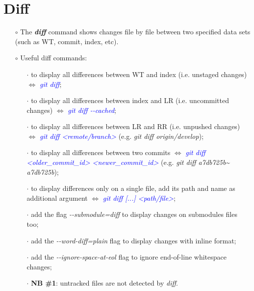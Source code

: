 \documentclass[a4paper,portrait,10pt]{article}   %
\newcommand{\mybulletlvA}{$\circ$}   %
\newcommand{\mybulletlvB}{$\cdot$}   %
\newcommand{\mydiv}{$\Leftrightarrow$ }   %
\newcommand{\mycmd}[1]{\textcolor{blue}{\textit{#1}}}   %
\newcommand{\myvspace}{\vspace{4mm}}   %
\begin{document}

\section{Diff}   \label{sec:Diff}

\begin{itemize}
\item[\mybulletlvA] The \textbf{\textit{diff}} command shows changes file by file between two specified data sets (such as WT, commit, index, etc).
\myvspace

\item[\mybulletlvA] Useful diff commands:
\begin{itemize}
  \item[\mybulletlvB] to display all differences between WT and index (i.e. unstaged changes) \mydiv \mycmd{git diff};
  \item[\mybulletlvB] to display all differences between index and LR (i.e. uncommitted changes) \mydiv \mycmd{git diff -{}-cached};
  \item[\mybulletlvB] to display all differences between LR and RR (i.e. unpushed changes) \mydiv \mycmd{git diff <remote/branch>} (e.g. \textit{git diff origin/develop});
  \item[\mybulletlvB] to display all differences between two commits \mydiv \mycmd{git diff <older\_commit\_id> <newer\_commit\_id>} (e.g. \textit{git diff a7db725b\textasciitilde{} a7db725b});
  \item[\mybulletlvB] to display differences only on a single file, add its path and name as additional argument \mydiv \mycmd{git diff [...] <path/file>};
  \item[\mybulletlvB] add the flag \textit{-{}-submodule=diff} to display changes on submodules files too;
  \item[\mybulletlvB] add the \textit{-{}-word-diff=plain} flag to display changes with inline format;
  \item[\mybulletlvB] add the \textit{-{}-ignore-space-at-eol} flag to ignore end-of-line whitespace changes;
  \item[\mybulletlvB] \textbf{NB \#1}: untracked files are not detected by \textit{diff}.
\end{itemize}
\end{itemize}
\myvspace

\end{document}
